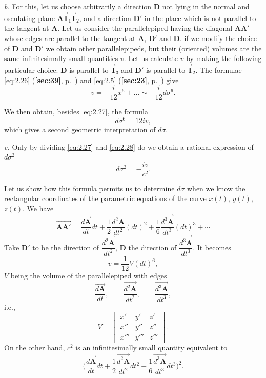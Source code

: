 \documentclass[leqno,11pt]{book}
\numberwithin{equation}{chapter}
\theoremstyle{shape1}
\theoremstyle{shapesmall}
\newcommand{\fsref}[1]{{\rm\textsection\textbf{\ref{sec:#1}}}}
\newcommand{\rvec}[1]{\vec{\mathbf{#1}}}
\newcommand{\ivec}{\rvec{I}}
\newcommand{\somespace}{\vspace{9pt}}
\begin{document}
\somespace

\emph{b.} For this, let us choose arbitrarily a direction $\mathbf{D}$ not lying in the normal and osculating plane $\mathbf{A}\ivec_{1}\ivec_{2}$, and a direction $\mathbf{D}'$ in the place which is not parallel to the tangent at $\mathbf{A}$. Let us consider the parallelepiped having the diagonal $\mathbf{AA}'$ whose edges are parallel to the tangent at $\mathbf{A}$, $\mathbf{D}'$ and $\mathbf{D}$. if we modify the choice of $\mathbf{D}$ and $\mathbf{D}'$ we obtain other parallelepipeds, but their (oriented) volumes are the same infinitesimally small quantities $v$. Let us calculate $v$ by making the following particular choice: $\mathbf{D}$ is parallel to $\ivec_{3}$ and $\mathbf{D}'$ is parallel to $\ivec_{2}$. The formulae \eqref{eq:2.26} (\fsref{39}, p.~\pageref{eq:2.26}) and \eqref{eq:2.5} (\fsref{23}, p.~\pageref{eq:2.5}) give
\[
v=-\frac{i}{12}x^{6}+\dots\sim-\frac{i}{12}d\sigma^{6}.
\]

We then obtain, besides \eqref{eq:2.27}, the formula
\begin{equation}
  \label{eq:2.28}
  d\sigma^{6}=12iv,
\end{equation}
which gives a second geometric interpretation of $d\sigma$.

\somespace

\emph{c.} Only by dividing \eqref{eq:2.27} and \eqref{eq:2.28} do we obtain a rational expression of $d\sigma^{2}$
\begin{equation}
  \label{eq:2.29}
  d\sigma^{2}=-\frac{iv}{c^{2}}.
\end{equation}

Let us show how this formula permits us to determine $d\sigma$ when we know the rectangular coordinates of the parametric equations of the curve $x(t)$, $y(t)$, $z(t)$. We have
\[
\overrightarrow{\mathbf{AA}'}=\frac{\overrightarrow{d\mathbf{A}}}{dt}dt+\frac{1}{2}\frac{d^{2}\mathbf{A}}{dt^{2}}(dt)^{2}+\frac{1}{6}\frac{\overrightarrow{d^{3}\mathbf{A}}}{dt^{3}}(dt)^{3}+\cdots
\]
Take $\mathbf{D}'$ to be the direction of $\dfrac{\overrightarrow{d^{2}\mathbf{A}}}{dt^{2}}$, $\mathbf{D}$ the direction of $\dfrac{\overrightarrow{d^{3}\mathbf{A}}}{dt^{3}}$. It becomes
\[
v=\frac{1}{12}V(dt)^{6},
\]
$V$ being the volume of the parallelepiped with edges
\[
\frac{\overrightarrow{d\mathbf{A}}}{dt},\qquad
\frac{\overrightarrow{d^{2}\mathbf{A}}}{dt^{2}},\qquad
\frac{\overrightarrow{d^{3}\mathbf{A}}}{dt^{3}},
\]
i.e.,
\[
V=
\begin{vmatrix}
  x'&y'&z'\\
  x''&y''&z''\\
  x'''&y'''&z'''
\end{vmatrix}.
\]
On the other hand, $c^{2}$ is an infinitesimally small quantity equivalent to
\[
\biggl(\frac{\overrightarrow{d\mathbf{A}}}{dt}dt+\frac{1}{2}\frac{\overrightarrow{d^{2}\mathbf{A}}}{dt^{2}}dt^{2}+\frac{1}{6}\frac{\overrightarrow{d^{3}\mathbf{A}}}{dt^{3}}dt^{3}\biggr)^{2}.
\]
\end{document}
